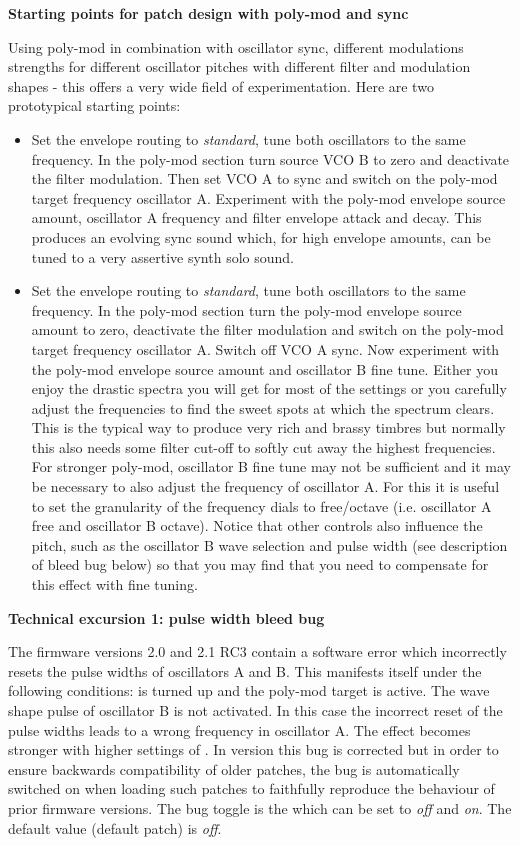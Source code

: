 \textbf{Starting points for patch design with poly-mod and sync}

Using poly-mod in combination with oscillator sync, different modulations strengths for different oscillator pitches with different filter and modulation shapes - this offers a very wide field of experimentation. Here are two prototypical starting points:

\begin{itemize}
  \item Set the envelope routing to \textit{standard}, tune both oscillators to the same frequency. In the poly-mod section turn source VCO B to zero and deactivate the filter modulation. Then set VCO A to sync and switch on the poly-mod target frequency oscillator A. Experiment with the poly-mod envelope source amount, oscillator A frequency and filter envelope attack and decay. This produces an evolving sync sound which, for high envelope amounts, can be tuned to a very assertive synth solo sound.
  \item Set the envelope routing to \textit{standard}, tune both oscillators to the same frequency. In the poly-mod section turn the poly-mod envelope source amount to zero, deactivate the filter modulation  and switch on the poly-mod target frequency oscillator A. Switch off VCO A sync. Now experiment with the poly-mod envelope source amount and oscillator B fine tune. Either you enjoy the drastic spectra you will get for most of the settings or you carefully adjust the frequencies to find the sweet spots at which the spectrum clears. This is the typical way to produce very rich and brassy timbres but normally this also needs some filter cut-off to softly cut away the highest frequencies. For stronger poly-mod, oscillator B fine tune may not be sufficient and it may be necessary to also adjust the frequency of oscillator A. For this it is useful to set the granularity of the frequency dials to free/octave (i.e. oscillator A free and oscillator B octave). Notice that other controls also influence the pitch, such as the oscillator B wave selection and pulse width (see description of bleed bug below) so that you may find that you need to compensate for this effect with fine tuning.   
\end{itemize} 

\textbf{Technical excursion 1: pulse width bleed bug}

The firmware versions 2.0 and 2.1 RC3 contain a software error which incorrectly resets the pulse widths of oscillators A and B. This manifests itself under the following conditions: \polymodosc is turned up and the poly-mod target \polymodfreq is active. The wave shape pulse of oscillator B is not activated. In this case the incorrect reset of the pulse widths leads to a wrong frequency in oscillator A. The effect becomes stronger with higher settings of \polymodosc. In version \version this bug is corrected but in order to ensure backwards compatibility of older patches, the bug is automatically switched on when loading such patches to faithfully reproduce the behaviour of prior firmware versions.  The bug toggle is the \syncbug which can be set to \textit{off} and \textit{on}. The default value (default patch) is \textit{off}.

